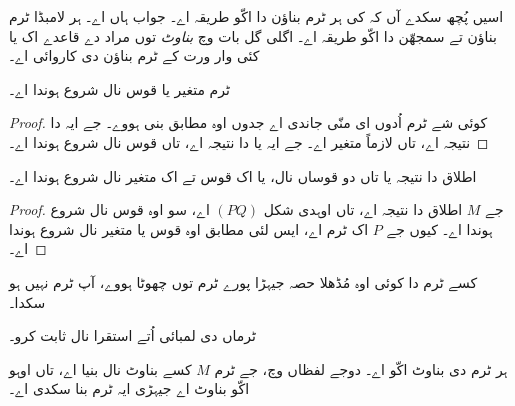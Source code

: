 \documentclass[../../../include/open-logic-section]{subfiles}
\begin{document}

اسیں پُچھ سکدے آں کہ کی ہر ٹرم بناؤن دا اکّو طریقہ اے۔ جواب ہاں
اے۔ ہر لامبڈا ٹرم بناؤن تے سمجھّن دا اکّو طریقہ اے۔ اگلی گل بات وچ
\emph{بناوٹ} توں مراد  دے قاعدے اک یا کئی
وار ورت کے ٹرم بناؤن دی کاروائی اے۔

\begin{lem}
ٹرم متغیر یا قوس نال شروع ہوندا اے۔
\end{lem}

\begin{proof}
کوئی شے ٹرم اُدوں ای منّی جاندی اے جدوں اوہ 
مطابق بنی ہووے۔ جے ایہ  دا نتیجہ اے، تاں
لازماً متغیر اے۔ جے ایہ  یا
 دا نتیجہ اے، تاں قوس نال شروع ہوندا اے۔
\end{proof}

\begin{lem}
اطلاق دا نتیجہ یا تاں دو قوساں نال، یا اک قوس تے اک متغیر نال
شروع ہوندا اے۔
\end{lem}

\begin{proof}
جے $M$ اطلاق دا نتیجہ اے، تاں اوہدی شکل $(PQ)$ اے، سو اوہ قوس نال
شروع ہوندا اے۔ کیوں جے $P$ اک ٹرم اے، ایس لئی 
مطابق اوہ قوس یا متغیر نال شروع ہوندا اے۔
\end{proof}

\begin{lem}
کسے ٹرم دا کوئی اوہ مُڈھلا حصہ جیہڑا پورے ٹرم توں چھوٹا ہووے،
آپ ٹرم نہیں ہو سکدا۔
\end{lem}

\begin{prob}
ٹرماں دی لمبائی اُتے استقرا نال 
ثابت کرو۔
\end{prob}

\begin{prop} 
ہر ٹرم دی بناوٹ اکّو اے۔ دوجے لفظاں وچ، جے ٹرم $M$ کسے بناوٹ نال
بنیا اے، تاں اوہو اکّو بناوٹ اے جیہڑی ایہ ٹرم بنا سکدی اے۔
\end{prop}
\end{document}
